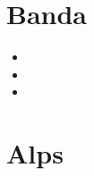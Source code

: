 \section{Banda}

\begin{scriptsize}
\begin{itemize}
\item[\twothousandnine]
\item[\twothousandten]
\item[\twothousandtwentyone]
\end{itemize}
\end{scriptsize}

\section{Alps}

